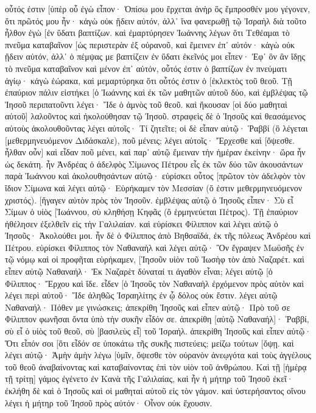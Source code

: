 οὗτός ἐστιν [ὑπὲρ οὗ ἐγὼ εἶπον· Ὀπίσω μου ἔρχεται ἀνὴρ ὃς ἔμπροσθέν μου γέγονεν, ὅτι πρῶτός μου ἦν· 
κἀγὼ οὐκ ᾔδειν αὐτόν, ἀλλ᾽ ἵνα φανερωθῇ τῷ Ἰσραὴλ διὰ τοῦτο ἦλθον ἐγὼ [ἐν ὕδατι βαπτίζων. 
καὶ ἐμαρτύρησεν Ἰωάννης λέγων ὅτι Τεθέαμαι τὸ πνεῦμα καταβαῖνον [ὡς περιστερὰν ἐξ οὐρανοῦ, καὶ ἔμεινεν ἐπ᾽ αὐτόν· 
κἀγὼ οὐκ ᾔδειν αὐτόν, ἀλλ᾽ ὁ πέμψας με βαπτίζειν ἐν ὕδατι ἐκεῖνός μοι εἶπεν· Ἐφ᾽ ὃν ἂν ἴδῃς τὸ πνεῦμα καταβαῖνον καὶ μένον ἐπ᾽ αὐτόν, οὗτός ἐστιν ὁ βαπτίζων ἐν πνεύματι ἁγίῳ· 
κἀγὼ ἑώρακα, καὶ μεμαρτύρηκα ὅτι οὗτός ἐστιν ὁ [ἐκλεκτὸς τοῦ θεοῦ. 
Τῇ ἐπαύριον πάλιν εἱστήκει [ὁ Ἰωάννης καὶ ἐκ τῶν μαθητῶν αὐτοῦ δύο, 
καὶ ἐμβλέψας τῷ Ἰησοῦ περιπατοῦντι λέγει· Ἴδε ὁ ἀμνὸς τοῦ θεοῦ. 
καὶ ἤκουσαν [οἱ δύο μαθηταὶ αὐτοῦ] λαλοῦντος καὶ ἠκολούθησαν τῷ Ἰησοῦ. 
στραφεὶς δὲ ὁ Ἰησοῦς καὶ θεασάμενος αὐτοὺς ἀκολουθοῦντας λέγει αὐτοῖς· Τί ζητεῖτε; οἱ δὲ εἶπαν αὐτῷ· Ῥαββί (ὃ λέγεται [μεθερμηνευόμενον Διδάσκαλε), ποῦ μένεις; 
λέγει αὐτοῖς· Ἔρχεσθε καὶ [ὄψεσθε. ἦλθαν οὖν] καὶ εἶδαν ποῦ μένει, καὶ παρ᾽ αὐτῷ ἔμειναν τὴν ἡμέραν ἐκείνην· ὥρα ἦν ὡς δεκάτη. 
ἦν Ἀνδρέας ὁ ἀδελφὸς Σίμωνος Πέτρου εἷς ἐκ τῶν δύο τῶν ἀκουσάντων παρὰ Ἰωάννου καὶ ἀκολουθησάντων αὐτῷ· 
εὑρίσκει οὗτος [πρῶτον τὸν ἀδελφὸν τὸν ἴδιον Σίμωνα καὶ λέγει αὐτῷ· Εὑρήκαμεν τὸν Μεσσίαν (ὅ ἐστιν μεθερμηνευόμενον χριστός). 
[ἤγαγεν αὐτὸν πρὸς τὸν Ἰησοῦν. ἐμβλέψας αὐτῷ ὁ Ἰησοῦς εἶπεν· Σὺ εἶ Σίμων ὁ υἱὸς [Ἰωάννου, σὺ κληθήσῃ Κηφᾶς (ὃ ἑρμηνεύεται Πέτρος). 
Τῇ ἐπαύριον ἠθέλησεν ἐξελθεῖν εἰς τὴν Γαλιλαίαν. καὶ εὑρίσκει Φίλιππον καὶ λέγει αὐτῷ ὁ Ἰησοῦς· Ἀκολούθει μοι. 
ἦν δὲ ὁ Φίλιππος ἀπὸ Βηθσαϊδά, ἐκ τῆς πόλεως Ἀνδρέου καὶ Πέτρου. 
εὑρίσκει Φίλιππος τὸν Ναθαναὴλ καὶ λέγει αὐτῷ· Ὃν ἔγραψεν Μωϋσῆς ἐν τῷ νόμῳ καὶ οἱ προφῆται εὑρήκαμεν, [Ἰησοῦν υἱὸν τοῦ Ἰωσὴφ τὸν ἀπὸ Ναζαρέτ. 
καὶ εἶπεν αὐτῷ Ναθαναήλ· Ἐκ Ναζαρὲτ δύναταί τι ἀγαθὸν εἶναι; λέγει αὐτῷ [ὁ Φίλιππος· Ἔρχου καὶ ἴδε. 
εἶδεν [ὁ Ἰησοῦς τὸν Ναθαναὴλ ἐρχόμενον πρὸς αὐτὸν καὶ λέγει περὶ αὐτοῦ· Ἴδε ἀληθῶς Ἰσραηλίτης ἐν ᾧ δόλος οὐκ ἔστιν. 
λέγει αὐτῷ Ναθαναήλ· Πόθεν με γινώσκεις; ἀπεκρίθη Ἰησοῦς καὶ εἶπεν αὐτῷ· Πρὸ τοῦ σε Φίλιππον φωνῆσαι ὄντα ὑπὸ τὴν συκῆν εἶδόν σε. 
ἀπεκρίθη [αὐτῷ Ναθαναήλ]· Ῥαββί, σὺ εἶ ὁ υἱὸς τοῦ θεοῦ, σὺ [βασιλεὺς εἶ] τοῦ Ἰσραήλ. 
ἀπεκρίθη Ἰησοῦς καὶ εἶπεν αὐτῷ· Ὅτι εἶπόν σοι [ὅτι εἶδόν σε ὑποκάτω τῆς συκῆς πιστεύεις; μείζω τούτων [ὄψῃ. 
καὶ λέγει αὐτῷ· Ἀμὴν ἀμὴν λέγω [ὑμῖν, ὄψεσθε τὸν οὐρανὸν ἀνεῳγότα καὶ τοὺς ἀγγέλους τοῦ θεοῦ ἀναβαίνοντας καὶ καταβαίνοντας ἐπὶ τὸν υἱὸν τοῦ ἀνθρώπου. 
Καὶ τῇ [ἡμέρᾳ τῇ τρίτῃ] γάμος ἐγένετο ἐν Κανὰ τῆς Γαλιλαίας, καὶ ἦν ἡ μήτηρ τοῦ Ἰησοῦ ἐκεῖ· 
ἐκλήθη δὲ καὶ ὁ Ἰησοῦς καὶ οἱ μαθηταὶ αὐτοῦ εἰς τὸν γάμον. 
καὶ ὑστερήσαντος οἴνου λέγει ἡ μήτηρ τοῦ Ἰησοῦ πρὸς αὐτόν· Οἶνον οὐκ ἔχουσιν. 
